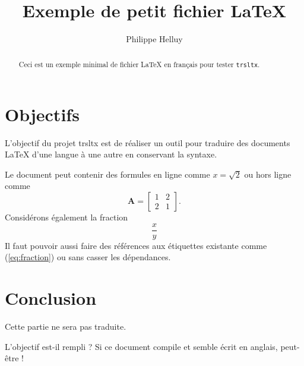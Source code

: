 
\title{Exemple de petit fichier \LaTeX}
\author{Philippe Helluy}
\maketitle
\begin{abstract}
Ceci est un exemple minimal de fichier \LaTeX{} en français pour tester
\texttt{trsltx}.
\end{abstract}
\section{Objectifs}
L'objectif du projet trsltx est de réaliser un outil pour traduire
des documents \LaTeX{}
d'une langue à une autre en conservant {} la syntaxe.

Le document peut contenir des formules en ligne comme $x=\sqrt{2}$
ou hors ligne comme
\begin{equation}
\mathbf{A}=\left[\begin{array}{cc}
1 & 2\\
2 & 1
\end{array}\right].\label{eq:matrice}
\end{equation}
Considérons également la fraction
\begin{equation}
\frac{x}{y} \label{eq:fraction}
\end{equation}
Il faut pouvoir aussi faire des références aux étiquettes existante
comme (\ref{eq:fraction}) ou  sans casser les dépendances.
\section{Conclusion}

Cette partie ne 
sera pas traduite.

L'objectif est-il rempli ? Si ce document compile et semble écrit
en anglais, peut-être !
